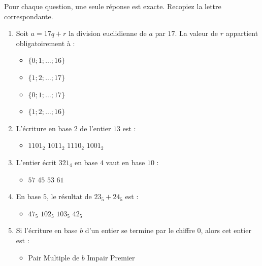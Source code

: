 \documentclass[11pt]{article}
\begin{document}
\begin{exercice}
Pour chaque question, une seule réponse est exacte. Recopiez la lettre correspondante.
\begin{enumerate}
    \item Soit $a = 17q + r$ la division euclidienne de $a$ par $17$. La valeur de $r$ appartient obligatoirement à :
    \begin{itemize}
        \item[A)] $\{0; 1; \dots; 16\}$
        \item[B)] $\{1; 2; \dots; 17\}$
        \item[C)] $\{0; 1; \dots; 17\}$
        \item[D)] $\{1; 2; \dots; 16\}$
    \end{itemize}
    \item L'écriture en base $2$ de l'entier $13$ est :
    \begin{itemize}
        \item[A)] $1101_2$ \quad [B)] $1011_2$ \quad [C)] $1110_2$ \quad [D)] $1001_2$
    \end{itemize}
    \item L'entier écrit $321_4$ en base $4$ vaut en base $10$ :
    \begin{itemize}
        \item[A)] $57$ \quad [B)] $45$ \quad [C)] $53$ \quad [D)] $61$
    \end{itemize}
    \item En base $5$, le résultat de $23_5 + 24_5$ est :
    \begin{itemize}
        \item[A)] $47_5$ \quad [B)] $102_5$ \quad [C)] $103_5$ \quad [D)] $42_5$
    \end{itemize}
    \item Si l'écriture en base $b$ d'un entier se termine par le chiffre $0$, alors cet entier est :
    \begin{itemize}
        \item[A)] Pair \quad [B)] Multiple de $b$ \quad [C)] Impair \quad [D)] Premier
    \end{itemize}
\end{enumerate}
\end{exercice}
\end{document}
